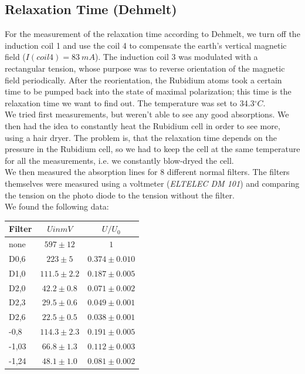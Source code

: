 
\subsection{Relaxation Time (Dehmelt)}

For the measurement of the relaxation time according to Dehmelt, we turn off the induction coil 1 and use the coil 4 to compensate the earth's vertical magnetic field ($I(coil4) = 83\ mA$). The induction coil 3 was modulated with a rectangular tension, whose purpose was to reverse orientation of the magnetic field periodically. After the reorientation, the Rubidium atoms took a certain time to be pumped back into the state of maximal polarization; this time is the relaxation time we want to find out. The temperature was set to 34.3$^\circ C$.\\

We tried first measurements, but weren't able to see any good absorptions. We then had the idea to constantly heat the Rubidium cell in order to see more, using a hair dryer. The problem is, that the relaxation time depends on the pressure in the Rubidium cell, so we had to keep the cell at the same temperature for all the measurements, i.e. we constantly blow-dryed the cell.\\

We then measured the absorption lines for 8 different normal filters. The filters themselves were measured using a voltmeter (\emph{ELTELEC DM 101}) and comparing the tension on the photo diode to the tension without the filter.\\

We found the following data:

\begin{center}
\begin{tabular}[H]{l | c c}
Filter & $U in mV$ & $U/U_0$ \\ \hline
none & $597 \pm 12$ &    $1$\\
D0,6 & $223 \pm 5$ &        $0.374 \pm 0.010$ \\
D1,0 & $111.5 \pm 2.2$ & $ 0.187 \pm 0.005$ \\
D2,0 & $42.2 \pm 0.8$ &   $ 0.071 \pm 0.002$\\
D2,3 & $29.5 \pm 0.6$ &   $ 0.049 \pm 0.001$\\
D2,6 & $22.5 \pm 0.5$ &    $0.038 \pm 0.001$\\
-0,8  & $114.3 \pm 2.3$ &  $0.191 \pm 0.005$\\
-1,03 & $66.8 \pm 1.3 $&   $0.112 \pm 0.003$\\
-1,24 & $48.1 \pm 1.0$ &   $0.081 \pm 0.002$\\
\end{tabular}
\end{center}

